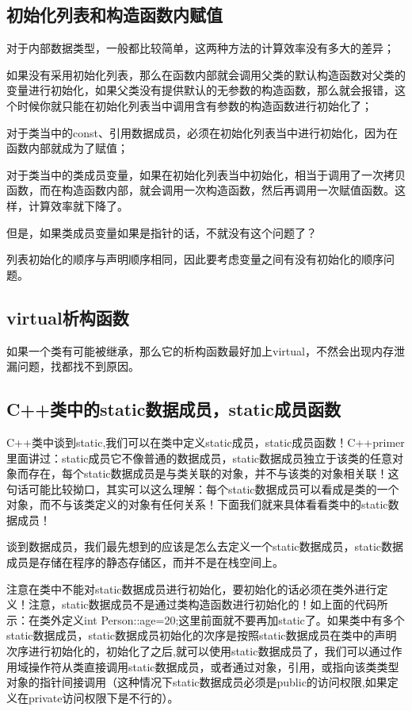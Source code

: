 \subsection{初始化列表和构造函数内赋值}
对于内部数据类型，一般都比较简单，这两种方法的计算效率没有多大的差异；

如果没有采用初始化列表，那么在函数内部就会调用父类的默认构造函数对父类的变量进行初始化，如果父类没有提供默认的无参数的构造函数，那么就会报错，这个时候你就只能在初始化列表当中调用含有参数的构造函数进行初始化了；

对于类当中的const、引用数据成员，必须在初始化列表当中进行初始化，因为在函数内部就成为了赋值；

对于类当中的类成员变量，如果在初始化列表当中初始化，相当于调用了一次拷贝函数，而在构造函数内部，就会调用一次构造函数，然后再调用一次赋值函数。这样，计算效率就下降了。

但是，如果类成员变量如果是指针的话，不就没有这个问题了？

列表初始化的顺序与声明顺序相同，因此要考虑变量之间有没有初始化的顺序问题。
\subsection{virtual析构函数}
如果一个类有可能被继承，那么它的析构函数最好加上virtual，不然会出现内存泄漏问题，找都找不到原因。
\subsection{C++类中的static数据成员，static成员函数}
C++类中谈到static,我们可以在类中定义static成员，static成员函数！C++primer里面讲过：static成员它不像普通的数据成员，static数据成员独立于该类的任意对象而存在，每个static数据成员是与类关联的对象，并不与该类的对象相关联！这句话可能比较拗口，其实可以这么理解：每个static数据成员可以看成是类的一个对象，而不与该类定义的对象有任何关系！下面我们就来具体看看类中的static数据成员！

谈到数据成员，我们最先想到的应该是怎么去定义一个static数据成员，static数据成员是存储在程序的静态存储区，而并不是在栈空间上。

注意在类中不能对static数据成员进行初始化，要初始化的话必须在类外进行定义！注意，static数据成员不是通过类构造函数进行初始化的！如上面的代码所示：在类外定义int Person::age=20;这里前面就不要再加static了。如果类中有多个static数据成员，static数据成员初始化的次序是按照static数据成员在类中的声明次序进行初始化的，初始化了之后,就可以使用static数据成员了，我们可以通过作用域操作符从类直接调用static数据成员，或者通过对象，引用，或指向该类类型对象的指针间接调用（这种情况下static数据成员必须是public的访问权限,如果定义在private访问权限下是不行的）。

